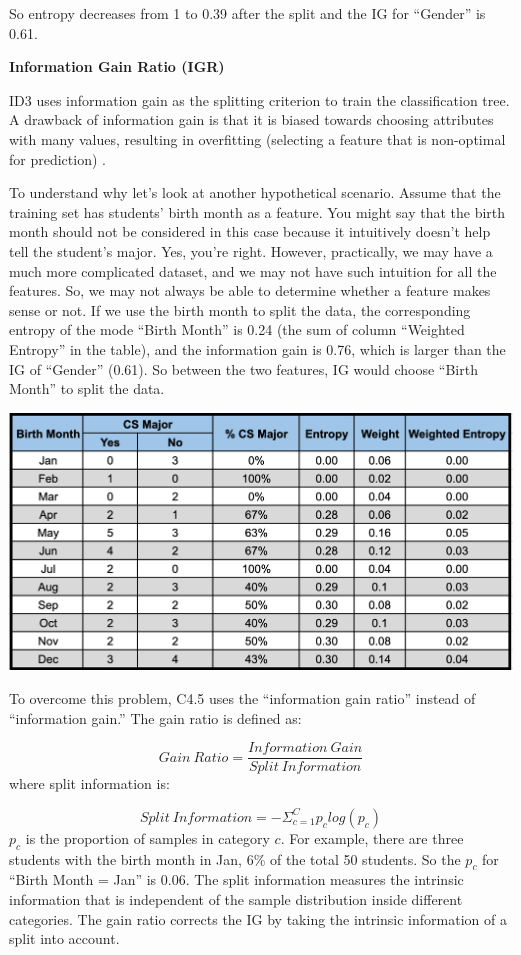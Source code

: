 \documentclass[12pt,]{krantz}
\begin{document}
So entropy decreases from 1 to 0.39 after the split and the IG for ``Gender'' is 0.61.

\textbf{Information Gain Ratio (IGR)}

ID3 uses information gain as the splitting criterion to train the classification tree. A drawback of information gain is that it is biased towards choosing attributes with many values, resulting in overfitting (selecting a feature that is non-optimal for prediction) \citep{HSSINA2014}.

To understand why let's look at another hypothetical scenario. Assume that the training set has students' birth month as a feature. You might say that the birth month should not be considered in this case because it intuitively doesn't help tell the student's major. Yes, you're right. However, practically, we may have a much more complicated dataset, and we may not have such intuition for all the features. So, we may not always be able to determine whether a feature makes sense or not. If we use the birth month to split the data, the corresponding entropy of the mode ``Birth Month'' is 0.24 (the sum of column ``Weighted Entropy'' in the table), and the information gain is 0.76, which is larger than the IG of ``Gender'' (0.61). So between the two features, IG would choose ``Birth Month'' to split the data.

\includegraphics{images/infogainratioexp.png}

To overcome this problem, C4.5 uses the ``information gain ratio'' instead of ``information gain.'' The gain ratio is defined as:

\[Gain\ Ratio = \frac{Information\ Gain}{Split\ Information}\]
where split information is:

\[Split\ Information = -\Sigma_{c = 1}^{C}p_clog(p_c)\]
\(p_c\) is the proportion of samples in category \(c\). For example, there are three students with the birth month in Jan, 6\% of the total 50 students. So the \(p_c\) for ``Birth Month = Jan'' is 0.06. The split information measures the intrinsic information that is independent of the sample distribution inside different categories. The gain ratio corrects the IG by taking the intrinsic information of a split into account.
\end{document}
